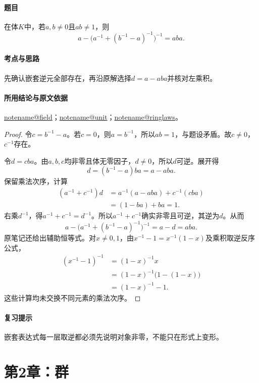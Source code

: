 \documentclass[UTF8,a4paper,11pt,fontset=windows]{ctexart}
\makeatletter
\newcommand{\noteref}[1]{\hyperref[note:#1]{\csname notename@#1\endcsname}}
\newcommand{\exref}[2]{\hyperref[ex:#1:#2]{第#1章习题#2}}
\makeatother
\begin{document}
\paragraph{题目}
在体$K$中，若$a,b\neq0$且$ab\neq1$，则
\[
a-\bigl(a^{-1}+(b^{-1}-a)^{-1}\bigr)^{-1}=aba.
\]

\paragraph{考点与思路}
先确认嵌套逆元全部存在，再沿原解选择$d=a-aba$并核对左乘积。

\paragraph{所用结论与原文依据}
\noteref{field}；\noteref{unit}；\noteref{ringlaws}。


\begin{proof}
令$c=b^{-1}-a$。若$c=0$，则$a=b^{-1}$，所以$ab=1$，与题设矛盾。故$c\ne0$，$c^{-1}$存在。

令$d=cba$。由$a,b,c$均非零且体无零因子，$d\ne0$，所以$d$可逆。展开得
\[
d=(b^{-1}-a)ba=a-aba.
\]
保留乘法次序，计算
\begin{align*}
(a^{-1}+c^{-1})d
&=a^{-1}(a-aba)+c^{-1}(cba)\\
&=(1-ba)+ba=1.
\end{align*}
右乘$d^{-1}$，得$a^{-1}+c^{-1}=d^{-1}$。所以$a^{-1}+c^{-1}$确实非零且可逆，其逆为$d$。从而
\[
a-\bigl(a^{-1}+(b^{-1}-a)^{-1}\bigr)^{-1}
=a-d=aba.
\]
原笔记还给出辅助恒等式。对$x\ne0,1$，由$x^{-1}-1=x^{-1}(1-x)$及乘积取逆反序公式，
\begin{align*}
(x^{-1}-1)^{-1}&=(1-x)^{-1}x\\
&=(1-x)^{-1}\bigl(1-(1-x)\bigr)\\
&=(1-x)^{-1}-1.
\end{align*}
这些计算均未交换不同元素的乘法次序。
\end{proof}

\paragraph{复习提示}
嵌套表达式每一层取逆都必须先说明对象非零，不能只在形式上变形。


\clearpage\section{第2章：群}
\end{document}
